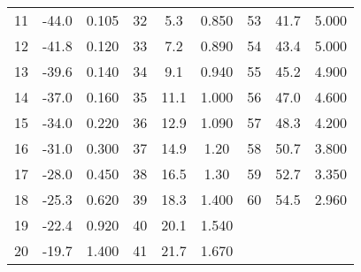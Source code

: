 \begin{table}
\begin{tabular}{c c c@{\hskip 0.5cm}||@{\hskip 0.5cm} c c c@{\hskip 0.5cm} ||@{\hskip 0.5cm} c c c}
11   & -44.0   &    0.105 & 32      &  5.3       & 0.850  &  53  &      41.7  &           5.000    \\
12   & -41.8   &    0.120  & 33      &  7.2       & 0.890  &  54  &      43.4  &           5.000  \\
13   & -39.6   &    0.140  & 34      &  9.1       & 0.940  &  55  &      45.2  &           4.900 \\
14   & -37.0     &    0.160  & 35      &  11.1      & 1.000     &  56  &      47.0  &           4.600 \\
15   & -34.0   &    0.220  & 36      &  12.9      & 1.090  &  57  &      48.3  &           4.200 \\
16   & -31.0     &    0.300   & 37      &  14.9      & 1.20   &  58  &      50.7  &           3.800 \\
17   & -28.0     &    0.450  & 38      &  16.5      & 1.30   &  59  &      52.7  &           3.350 \\
18   & -25.3   &    0.620  & 39      &  18.3      & 1.400   &  60  &      54.5  &           2.960 \\
19   & -22.4   &    0.920  & 40      &  20.1      & 1.540  & & & \\
20   & -19.7   &    1.400   & 41      &  21.7      & 1.670  & & & \\
    \end{tabular}
\end{table}


